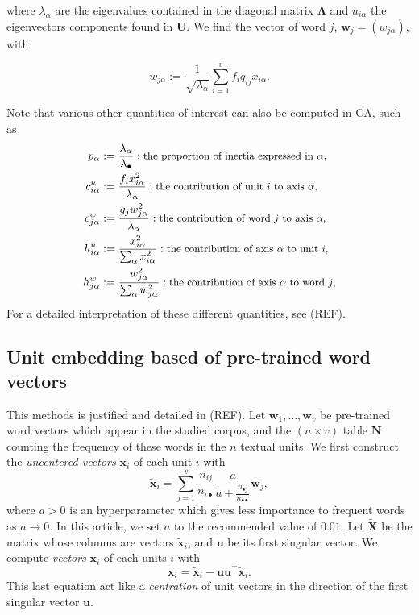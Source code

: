 \documentclass[
twocolumn,
]{ceurart}
\begin{document}
where $\lambda_\alpha$ are the eigenvalues contained in the diagonal matrix $\bm{\Lambda}$ and $u_{i \alpha}$ the eigenvectors components found in $\mathbf{U}$. We find the vector of word $j$, $\mathbf{w}_j = (w_{j\alpha})$, with 

\begin{equation}
w_{j\alpha} := \frac{1}{\sqrt{\lambda_\alpha}} \sum_{i=1}^v f_i q_{ij} x_{i \alpha}.
\end{equation}

Note that various other quantities of interest can also be computed in CA, such as 
\begin{align*}
p_\alpha &:= \frac{\lambda_\alpha}{\lambda_\bullet} :\text{\small the proportion of inertia expressed in $\alpha$,} \\
c^u_{i \alpha} &:= \frac{f_i x_{i\alpha}^2}{\lambda_\alpha} : \text{\small the contribution of unit $i$ to axis $\alpha$,} \\
c^w_{j \alpha} &:= \frac{g_j w_{j\alpha}^2}{\lambda_\alpha} : \text{\small the contribution of word $j$ to axis $\alpha$,} \\
h^u_{i \alpha} &:= \frac{x_{i\alpha}^2}{\sum_{\alpha} x_{i\alpha}^2} : \text{\small the contribution of  axis $\alpha$ to unit $i$,} \\
h^w_{j \alpha} &:= \frac{w_{j\alpha}^2}{\sum_{\alpha} w_{j\alpha}^2} : \text{\small the contribution of  axis $\alpha$ to word $j$,}
\end{align*}
For a detailed interpretation of these different quantities, see (REF). 

\subsection{Unit embedding based of pre-trained word vectors}
\label{wv_details}

This methods is justified and detailed in (REF). Let $\mathbf{w}_1, \ldots, \mathbf{w}_v$ be pre-trained word vectors which appear in the studied corpus, and the $(n \times v)$ table $\mathbf{N}$ counting the frequency of these words in the $n$ textual units. We first construct the \emph{uncentered vectors} $\widetilde{\mathbf{x}}_i$ of each unit $i$ with
\begin{equation}
\widetilde{\mathbf{x}}_i = \sum_{j = 1}^v \frac{n_{ij}}{n_{i \bullet}} \frac{a}{a + \frac{n_{\bullet j}}{n_{\bullet \bullet}}} \mathbf{w}_j,
\end{equation}
where $a > 0$ is an hyperparameter which gives less importance to frequent words as $a \to 0$. In this article, we set $a$ to the recommended value of $0.01$. Let $\widetilde{\mathbf{X}}$ be the matrix whose columns are vectors $\widetilde{\mathbf{x}}_i$, and $\mathbf{u}$ be its first singular vector. We compute \emph{vectors} $\mathbf{x}_i$ of each units $i$ with
\begin{equation}
\mathbf{x}_i = \widetilde{\mathbf{x}}_i - \mathbf{u}\mathbf{u}^\top \widetilde{\mathbf{x}}_i.
\end{equation}
This last equation act like a \emph{centration} of unit vectors in the direction of the first singular vector $\mathbf{u}$.


\end{document}
